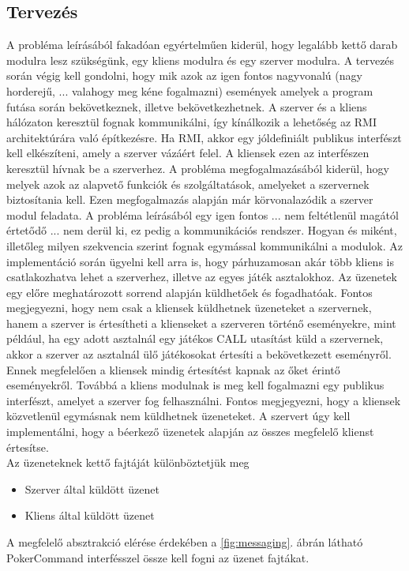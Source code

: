 \subsection{Tervezés}
A probléma leírásából fakadóan egyértelműen kiderül, hogy legalább kettő darab modulra lesz szükségünk, egy kliens modulra és egy szerver modulra. 
A tervezés során végig kell gondolni, hogy mik azok az igen fontos nagyvonalú (nagy horderejű, ... valahogy meg kéne fogalmazni) események amelyek a program futása során bekövetkeznek, illetve bekövetkezhetnek. A szerver és a kliens hálózaton keresztül fognak kommunikálni, így kínálkozik a lehetőség az RMI architektúrára való építkezésre. Ha RMI, akkor egy jóldefiniált publikus interfészt kell elkészíteni, amely a szerver vázáért felel. A kliensek ezen az interfészen keresztül hívnak be a szerverhez. A probléma megfogalmazásából kiderül, hogy melyek azok az alapvető funkciók és szolgáltatások, amelyeket a szervernek biztosítania kell. Ezen megfogalmazás alapján már körvonalazódik a szerver modul feladata. A probléma leírásából egy igen fontos ... nem feltétlenül magától értetődő ... nem derül ki, ez pedig a kommunikációs rendszer. Hogyan és miként, illetőleg milyen szekvencia szerint fognak egymással kommunikálni a modulok. Az implementáció során ügyelni kell arra is, hogy párhuzamosan akár több kliens is csatlakozhatva lehet a szerverhez, illetve az egyes játék asztalokhoz. Az üzenetek egy előre meghatározott sorrend alapján küldhetőek és fogadhatóak. Fontos megjegyezni, hogy nem csak a kliensek küldhetnek üzeneteket a szervernek, hanem a szerver is értesítheti a klienseket a szerveren történő eseményekre, mint például, ha egy adott asztalnál egy játékos CALL utasítást küld a szervernek, akkor a szerver az asztalnál ülő játékosokat értesíti a bekövetkezett eseményről. Ennek megfelelően a kliensek mindig értesítést kapnak az őket érintő eseményekről. Továbbá a kliens modulnak is meg kell fogalmazni egy publikus interfészt, amelyet a szerver fog felhasználni. Fontos megjegyezni, hogy a kliensek közvetlenül egymásnak nem küldhetnek üzeneteket. A szervert úgy kell implementálni, hogy a béerkező üzenetek alapján az összes megfelelő klienst értesítse. \\
Az üzeneteknek kettő fajtáját különböztetjük meg
 \begin{itemize}[leftmargin=2.7cm]
\item Szerver által küldött üzenet
\item Kliens által küldött üzenet
\end{itemize}
A megfelelő absztrakció elérése érdekében a \ref{fig:messaging}. ábrán látható PokerCommand interfésszel össze kell fogni az üzenet fajtákat.
